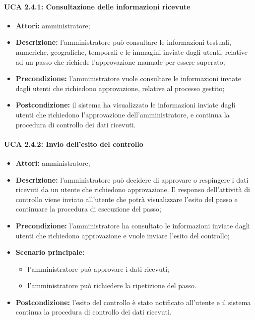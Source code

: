\paragraph{UCA 2.4.1: Consultazione delle informazioni ricevute}
\begin{itemize}
\item \textbf{Attori:} 
amministratore;
\item \textbf{Descrizione:} 
l'amministratore può consultare le informazioni testuali, numeriche, geografiche, temporali e le immagini inviate dagli utenti, relative ad un passo che richiede l'approvazione manuale per essere superato; 
\item \textbf{Precondizione:} 
l'amministratore vuole consultare le informazioni inviate dagli utenti che richiedono approvazione, relative al processo gestito;
\item \textbf{Postcondizione:} 
il sistema ha visualizzato le informazioni inviate dagli utenti che richiedono l'approvazione dell'amministratore, e continua la procedura di controllo dei dati ricevuti.
\end{itemize}

\paragraph{UCA 2.4.2: Invio dell'esito del controllo}
\begin{itemize}
\item \textbf{Attori:} 
amministratore;
\item \textbf{Descrizione:} 
l'amministratore può decidere di approvare o respingere i dati ricevuti da un utente che richiedono approvazione.
Il responso dell'attività di controllo viene inviato all'utente che potrà visualizzare l'esito del passo e continuare la procedura di esecuzione del passo;
\item \textbf{Precondizione:} 
l'amministratore ha consultato le informazioni inviate dagli utenti che richiedono approvazione e vuole inviare l'esito del controllo;
\item \textbf{Scenario principale:} 
\begin{itemize}
\item l'amministratore può approvare i dati ricevuti;
\item l'amministratore può richiedere la ripetizione del passo.
\end{itemize}
\item \textbf{Postcondizione:} 
l'esito del controllo è stato notificato all'utente e il sistema continua la procedura di controllo dei dati ricevuti.
\end{itemize}

